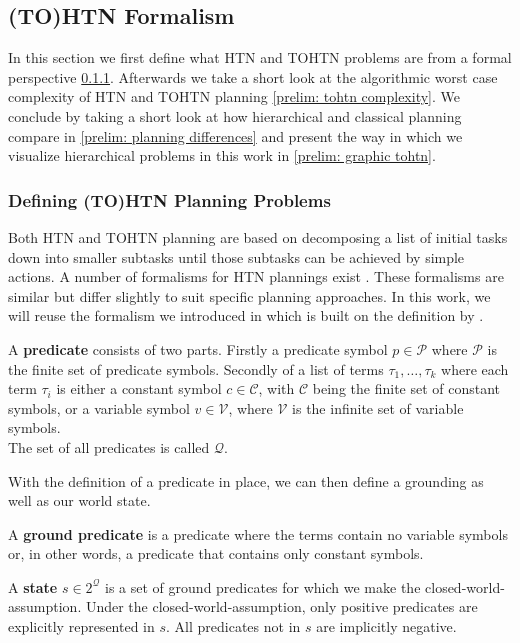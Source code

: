 \subsection{(TO)HTN Formalism}
\label{prelim: formalism}
In this section we first define what HTN and TOHTN problems are from a formal perspective \ref{prelim: tohtn problems}. Afterwards we take a short look at the algorithmic worst case complexity of HTN and TOHTN planning \ref{prelim: tohtn complexity}. We conclude by taking a short look at how hierarchical and classical planning compare in \ref{prelim: planning differences} and present the way in which we visualize hierarchical problems in this work in \ref{prelim: graphic tohtn}.

\subsubsection{Defining (TO)HTN Planning Problems}
\label{prelim: tohtn problems}
Both HTN and TOHTN planning are based on decomposing a list of initial tasks down into smaller subtasks until those subtasks can be achieved by simple actions. A number of formalisms for HTN plannings exist \cite{georgievski2015htn, behnke2018tracking, schreiber2021lilotane}. These formalisms are similar but differ slightly to suit specific planning approaches. In this work, we will reuse the formalism we introduced in \cite{bretl2021parallel} which is built on the definition by \cite{georgievski2015htn}.

\begin{definition} %
	A \textbf{predicate} consists of two parts. Firstly a predicate symbol $p \in \mathcal{P}$ where $\mathcal{P}$ is the finite set of predicate symbols. Secondly of a list of terms $\tau_1, \ldots, \tau_k$ where each term $\tau_i$ is either a constant symbol $c \in \mathcal{C}$, with $\mathcal{C}$ being the finite set of constant symbols, or a variable symbol $v \in \mathcal{V}$, where $\mathcal{V}$ is the infinite set of variable symbols. \\
	The set of all predicates is called $\mathcal{Q}$.
\end{definition}
With the definition of a predicate in place, we can then define a grounding as well as our world state.
\begin{definition} %
	A \textbf{ground predicate} is a predicate where the terms contain no variable symbols or, in other words, a predicate that contains only constant symbols.
\end{definition}
\begin{definition} %
	A \textbf{state} $s \in 2^{\mathcal{Q}}$ is a set of ground predicates for which we make the closed-world-assumption. Under the closed-world-assumption, only positive predicates are explicitly represented in $s$. All predicates not in $s$ are implicitly negative.
\end{definition}

